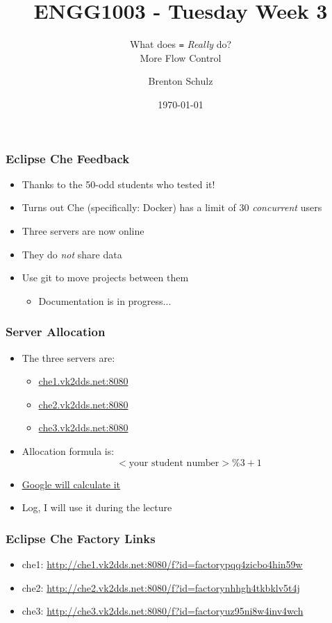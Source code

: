 \documentclass[14pt]{beamer}
\title{ENGG1003 - Tuesday Week 3}
\subtitle{What does \texttt{=} \textit{Really} do?\\More Flow Control}
\author{Brenton Schulz}
\institute{University of Newcastle}
\date{\today}
\begin{document}
\titlepage

\begin{frame}
\frametitle{Eclipse Che Feedback}
\begin{itemize}
\item Thanks to the 50-odd students who tested it!
\item Turns out Che (specifically: Docker) has a limit of 30 \textit{concurrent} users
\item Three servers are now online
\item They do \textit{not} share data
\item Use git to move projects between them
	\begin{itemize}
		\item Documentation is in progress...
	\end{itemize}
\end{itemize}
\end{frame}

\begin{frame}
\frametitle{Server Allocation}
\begin{itemize}
\item The three servers are:
	\begin{itemize}
		\item \url{che1.vk2dds.net:8080}
		\item \url{che2.vk2dds.net:8080}
		\item \url{che3.vk2dds.net:8080}
	\end{itemize}
\item Allocation formula is:
\begin{equation}
<\textrm{your student number}> \texttt{\%} 3 + 1
\end{equation}
\item \underline{\href{https://www.google.com.au/search?ei=NryGXNinIIiS9QOwvZQw&q=3094552}{Google will calculate it}}
\item Log, I will use it during the lecture
\end{itemize}
\end{frame}

\begin{frame}
\frametitle{Eclipse Che Factory Links}
\begin{itemize}
\item che1: \url{http://che1.vk2dds.net:8080/f?id=factorypqq4zicbo4hin59w}
\item che2: \url{http://che2.vk2dds.net:8080/f?id=factorynhhgh4tkbklv5t4j}
\item che3: \url{http://che3.vk2dds.net:8080/f?id=factoryuz95ni8w4inv4wch}
\end{itemize}
\end{frame}
\end{document}
